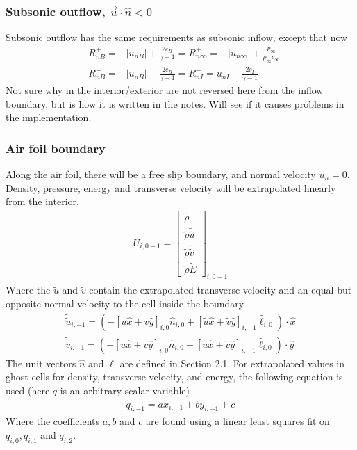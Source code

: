 \documentclass[11pt]{article}
\begin{document}
		\subsubsection*{Subsonic outflow, $\vec{u} \cdot \hat{n} < 0$}
		Subsonic outflow has the same requirements as subsonic inflow, except that now
			\begin{align}
			&R_{nB}^+ = -|u_{nB}| + \frac{2c_B}{\gamma - 1} = R_{n\infty}^+ = -|u_{n\infty}| + \frac{p_\infty}{\rho_\infty c_\infty} \\
			&R_{nB}^- = -|u_{nB}| - \frac{2c_B}{\gamma - 1} = R_{nI}^- =u_{nI} - \frac{2c_I}{\gamma - 1}
			\end{align}
		{\color{red} Not sure why in the interior/exterior are not reversed here from the inflow boundary, but is how it is written in the notes. Will see if it causes problems in the implementation.}
		\subsubsection{Air foil boundary}
		Along the air foil, there will be a free slip boundary, and normal velocity $u_n = 0$. Density, pressure, energy and transverse velocity will be extrapolated linearly from the interior.
			\begin{align}
			U_{i,0-1} = \begin{bmatrix}
			\tilde{\rho} \\ \tilde{\rho} \tilde{\tilde{u}} \\ \tilde{\rho} \tilde{\tilde{v}} \\ \tilde{\rho} \tilde{E}
			\end{bmatrix}_{i,0-1}
			\end{align}
		Where the $\tilde{\tilde{u}}$ and $\tilde{\tilde{v}}$ contain the extrapolated transverse velocity and an equal but opposite normal velocity to the cell inside the boundary
			\begin{align}
			\tilde{\tilde{u}}_{i,-1} = (-[u\hat{x} + v\hat{y}]_{i,0} \hat{n}_{i,0} + [\tilde{u}\hat{x} + \tilde{v}\hat{y}]_{i,-1} \hat{\ell}_{i,0}) \cdot \hat{x} \\
			\tilde{\tilde{v}} _{i,-1} = (-[u\hat{x} + v\hat{y}]_{i,0} \hat{n}_{i,0} + [\tilde{u}\hat{x} + \tilde{v}\hat{y}]_{i,-1} \hat{\ell}_{i,0}) \cdot \hat{y}
			\end{align}
		The unit vectors $\hat{n}$ and $\hat{\ell}$ are defined in Section 2.1. For extrapolated values in ghost cells for density, transverse velocity, and energy, the following equation is used (here $q$ is an arbitrary scalar variable)
			\begin{align}
			\tilde{q}_{i,-1} = ax_{i,-1} + by_{i,-1} + c
			\end{align}
		Where the coefficients $a, b$ and $c$ are found using a linear least squares fit on $q_{i,0}, q_{i,1}$ and $q_{i,2}$.
		
\end{document}
